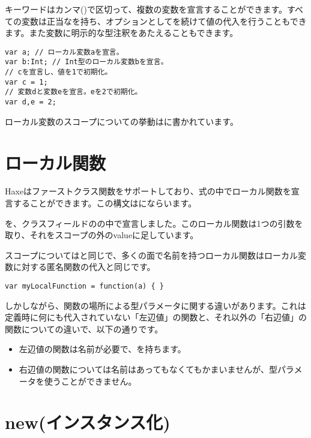 キーワードはカンマ(\expr{,})で区切って、複数の変数を宣言することができます。すべての変数は正当なを持ち、オプションとして\expr{=}を続けて値の代入を行うこともできます。また変数に明示的な型注釈をあたえることもできます。

\begin{lstlisting}
var a; // ローカル変数aを宣言。
var b:Int; // Int型のローカル変数bを宣言。
// cを宣言し、値を1で初期化。
var c = 1;
// 変数dと変数eを宣言。eを2で初期化。
var d,e = 2;
\end{lstlisting}

ローカル変数のスコープについての挙動はに書かれています。

\section{ローカル関数}
\label{expression-function}

Haxeはファーストクラス関数をサポートしており、式の中でローカル関数を宣言することができます。この構文はにならいます。


を、クラスフィールドのの中で宣言しました。このローカル関数は1つの引数を取り、それをスコープの外のvalueに足しています。

スコープについてはと同じで、多くの面で名前を持つローカル関数はローカル変数に対する匿名関数の代入と同じです。

\begin{lstlisting}
var myLocalFunction = function(a) { }
\end{lstlisting}

しかしながら、関数の場所による型パラメータに関する違いがあります。これは定義時に何にも代入されていない「左辺値」の関数と、それ以外の「右辺値」の関数についての違いで、以下の通りです。

\begin{itemize}
	\item 左辺値の関数は名前が必要で、を持ちます。
	\item 右辺値の関数については名前はあってもなくてもかまいませんが、型パラメータを使うことができません。
\end{itemize}

\section{new(インスタンス化)}
\label{expression-new}

